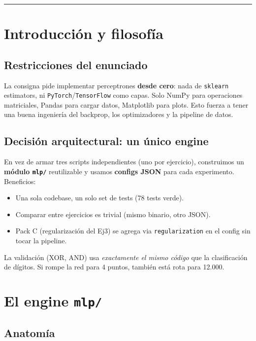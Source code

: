 \documentclass[11pt,a4paper]{article}
\newcommand{\code}[1]{\texttt{\textcolor{accent}{#1}}}
\begin{document}
\tableofcontents
\bigskip\hrule\bigskip

\section{Introducción y filosofía}

\subsection{Restricciones del enunciado}
La consigna pide implementar perceptrones \textbf{desde cero}: nada de \texttt{sklearn} estimators, ni \texttt{PyTorch}/\texttt{TensorFlow} como capas. Solo NumPy para operaciones matriciales, Pandas para cargar datos, Matplotlib para plots. Esto fuerza a tener una buena ingeniería del backprop, los optimizadores y la pipeline de datos.

\subsection{Decisión arquitectural: un único engine}
En vez de armar tres scripts independientes (uno por ejercicio), construimos un \textbf{módulo \code{mlp/}} reutilizable y usamos \textbf{configs JSON} para cada experimento. Beneficios:
\begin{itemize}[leftmargin=1.4em, itemsep=2pt]
  \item Una sola codebase, un solo set de tests (78 tests verde).
  \item Comparar entre ejercicios es trivial (mismo binario, otro JSON).
  \item Pack C (regularización del Ej3) se agrega via \code{regularization} en el config sin tocar la pipeline.
\end{itemize}

\begin{insight}
La validación (XOR, AND) usa \emph{exactamente el mismo código} que la clasificación de dígitos. Si rompe la red para 4 puntos, también está rota para 12.000.
\end{insight}

\section{El engine \code{mlp/}}

\subsection{Anatomía}
\end{document}
